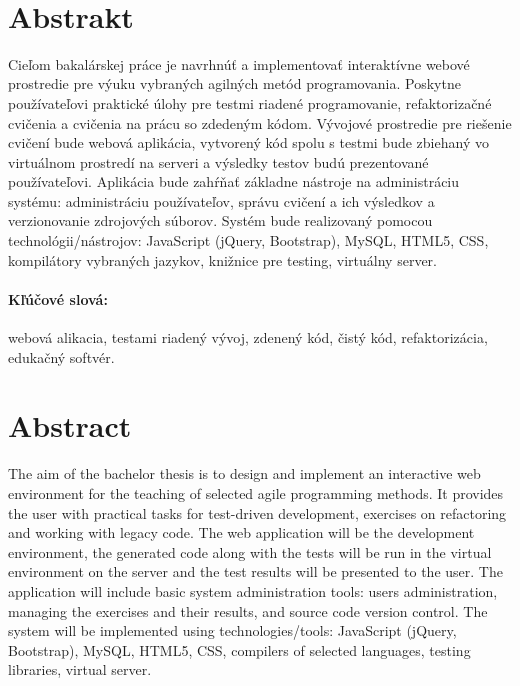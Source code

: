 \documentclass[12pt, oneside]{book}  %
\begin{document}

\frontmatter

\setcounter{page}{3}
\newpage 
~



\newpage 
\section*{Abstrakt}


Cieľom bakalárskej práce je navrhnúť a implementovať interaktívne webové prostredie pre výuku vybraných agilných metód programovania. Poskytne používateľovi praktické úlohy pre testmi riadené programovanie, refaktorizačné cvičenia a cvičenia na prácu so zdedeným kódom. Vývojové prostredie pre riešenie cvičení bude webová aplikácia, vytvorený kód spolu s testmi bude zbiehaný vo virtuálnom prostredí na serveri a výsledky testov budú prezentované používateľovi. Aplikácia bude zahŕňať základne nástroje na administráciu systému: administráciu používateľov, správu cvičení a ich výsledkov a verzionovanie zdrojových súborov. Systém bude realizovaný pomocou technológii/nástrojov: JavaScript (jQuery, Bootstrap), MySQL, HTML5, CSS, kompilátory vybraných jazykov, knižnice pre testing, virtuálny server.

\paragraph*{Kľúčové slová:} webová alikacia, testami riadený vývoj, zdenený kód, čistý kód, refaktorizácia, edukačný softvér.


\newpage 
\section*{Abstract}

The aim of the bachelor thesis is to design and implement an interactive web environment for the teaching of selected agile programming methods. It provides the user with practical tasks for test-driven development, exercises on refactoring and working with legacy code. The web application will be the development environment, the generated code along with the tests will be run in the virtual environment on the server and the test results will be presented to the user. The application will include basic system administration tools: users administration, managing the exercises and their results, and source code version control. The system will be implemented using technologies/tools: JavaScript (jQuery, Bootstrap), MySQL, HTML5, CSS, compilers of selected languages, testing libraries, virtual server.
\end{document}
